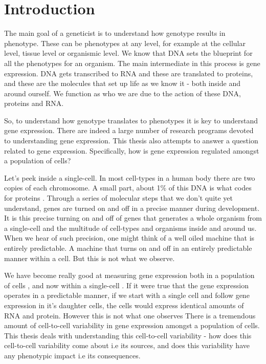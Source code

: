 \chapter{Introduction}
\label{chap:introduction}
\tightlists

The main goal of a geneticist is to understand how genotype results in phenotype. These can be phenotypes at any level, for example at the cellular level, tissue level or organismic level. We know that DNA sets the blueprint for all the phenotypes for an organism. The main intermediate in this process is gene expression. DNA gets transcribed to RNA and these are translated to proteins, and these are the molecules that set up life as we know it - both inside and around ourself. We function as who we are due to the action of these DNA, proteins and RNA.

So, to understand how genotype translates to phenotypes it is key to understand gene expression. There are indeed a large number of research programs devoted to understanding gene expression. This thesis also attempts to answer a question related to gene expression. Specifically, how is gene expression regulated amongst a population of cells?

Let's peek inside a single-cell. In most cell-types in a human body there are two copies of each chromosome. A small part, about 1\% of this DNA is what codes for proteins \cite {human genome}. Through a series of molecular steps that we don't quite yet understand, genes are turned on and off in a precise manner during development. It is this precise turning on and off of genes that generates a whole organism from a single-cell and the multitude of cell-types and organisms inside and around us. When we hear of such precision, one might think of a well oiled machine that is entirely predictable. A machine that turns on and off in an entirely predictable manner within a cell. But this is not what we observe.

We have become really good at measuring gene expression both in a population of cells \cite{bulk rnaseq, }, and now within a single-cell \cite{single-cell, flow cityu, smFish}. If it were true that the gene expression operates in a predictable manner, if we start with a single cell and follow gene expression in it's daughter cells, the cells would express identical amounts of RNA and protein. However this is not what one observes \cite{elowitz} There is a tremendous amount of cell-to-cell variability in gene expression amongst a population of cells. This thesis deals with understanding this cell-to-cell variability - how does this cell-to-cell variability come about i.e its sources, and does this variability have any phenotypic impact i.e its consequences.

